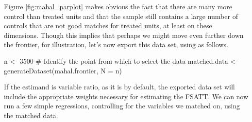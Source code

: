 \documentclass[nojss]{jss}
\begin{document}
Figure \ref{fig:mahal_parplot} makes obvious the fact that there are many more control than 
treated units and that the sample still contains a large number of controls that are
not good matches for treated units, at least on these dimensions. Though this implies that
perhaps we might move even further down the frontier, for illustration, let's now export
this data set, using  as follows.

\begin{CodeChunk}
\begin{CodeInput}
n <- 3500 # Identify the point from which to select the data
matched.data <- generateDataset(mahal.frontier, N = n)
\end{CodeInput}
\end{CodeChunk}

If the estimand is variable ratio, as it is by default, the exported
data set will include the appropriate weights necessary for estimating
the FSATT. We can now run a few simple regressions, controlling for
the variables we matched on, using the matched data.
\end{document}
